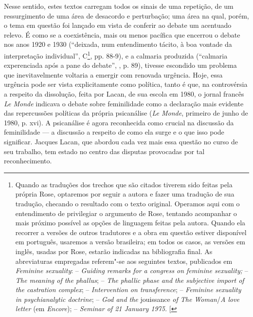 Nesse sentido, estes textos carregam todos os sinais de uma repetição,
de um ressurgimento de uma área de desacordo e perturbação; uma área na
qual, porém, o tema em questão foi lançado em vista de conferir ao
debate um acentuado relevo. É como se a coexistência, mais ou menos
pacífica que encerrou o debate nos anos 1920 e 1930 (``deixada, num
entendimento tácito, à boa vontade da interpretação individual'',
C\footnote{Quando as traduções dos trechos que são citados tiverem sido
  feitas pela própria Rose, optaremos por seguir a autora e fazer uma
  tradução de sua tradução, checando o resultado com o texto original.
  Operamos aqui com o entendimento de privilegiar o argumento de Rose,
  tentando acompanhar o mais próximo possível as opções de linguagem
  feitas pela autora. Quando ela recorrer a versões de outros tradutores
  e a obra em questão estiver disponível em português, usaremos a versão
  brasileira; em todos os casos, as versões em inglês, usadas por Rose,
  estarão indicadas na bibliografia final. As abreviaturas empregadas
  referem"-se aos seguintes textos, publicados em \emph{Feminine
  sexuality}:  -- \emph{Guiding remarks for a congress on feminine
  sexuality;}  -- \emph{The meaning of the phallus};  -- \emph{The
  phallic phase and the subjective import of the castration complex};
   -- \emph{Intervention on transference};  -- \emph{Feminine
  sexuality in psychianalytic doctrine};  -- \emph{God and the}
  jouissance \emph{of The Woman}/\emph{A love letter} (em
  \emph{Encore});  -- \emph{Seminar of 21 January 1975.} {[}\versal{N.~T.}{]}},
pp. 88-9), e a calmaria produzida (``calmaria experenciada após a pane
do debate'', , p. 89), tivesse escondido um problema que
inevitavelmente voltaria a emergir com renovada urgência. Hoje, essa
urgência pode ser vista explicitamente como política, tanto é que, na
controvérsia a respeito da dissolução, feita por Lacan, de sua escola em
1980, o jornal francês \emph{Le Monde} indicava o debate sobre
feminilidade como a declaração mais evidente das repercussões políticas
da própria psicanálise (\emph{Le Monde}, primeiro de junho de 1980, p.
xvi). A psicanálise é agora reconhecida como crucial na discussão da
feminilidade --- a discussão a respeito de como ela surge e o que isso
pode significar. Jacques Lacan, que abordou cada vez mais essa questão
no curso de seu trabalho, tem estado no centro das disputas provocadas
por tal reconhecimento.

